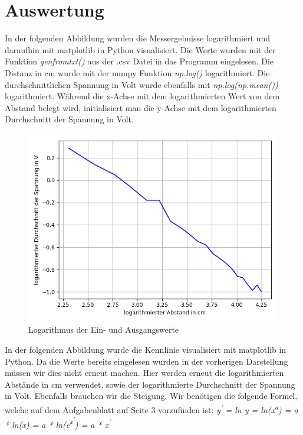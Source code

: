 \documentclass[12pt, oneside, a4paper, \docLanguage]{report}
\begin{document}
\section{Auswertung}
\label{chap:VERSUCH_2_AUSWERTUNG}
In der folgenden Abbildung wurden die Messergebnisse logarithmiert und daraufhin mit matplotlib in Python visualisiert.
Die Werte wurden mit der Funktion \textit{genfromtxt()} aus der .csv Datei in das Programm eingelesen.
Die Distanz in cm wurde mit der numpy Funktion \textit{np.log()} logarithmiert. Die durchschnittlichen Spannung in Volt wurde ebenfalls mit \textit{np.log(np.mean())} logarithmiert. 
Während die x-Achse mit dem logarithmierten Wert von dem Abstand belegt wird, initialisiert man die y-Achse mit dem logarithmierten Durchschnitt der Spannung in Volt.

\begin{figure}[hbt!]
	\centering\small
	\includegraphics[width=\textwidth]{media/myplot4.png}
	\caption{Logarithmus der Ein- und Ausgangswerte}
	\label{fig:Logarithmus der Ein- und Ausgangswerter}
\end{figure}
\newpage
In der folgenden Abbildung wurde die Kennlinie visualisiert mit matplotlib in Python.
\newline
Da die Werte bereits eingelesen wurden in der vorherigen Darstellung müssen wir dies nicht erneut machen.
Hier werden erneut die logarithmierten Abstände in cm verwendet, sowie der logarithmierte Durchschnitt der Spannung in Volt. Ebenfalls brauchen wir die Steigung.
Wir benötigen die folgende Formel, welche auf dem Aufgabenblatt auf Seite 3 vorzufinden ist:
\textit{y\textsuperscript{'} = ln y = ln(x\textsuperscript{a}) = a * ln(x) = a * ln(e\textsuperscript{x\textsuperscript{'}}) = a * x\textsuperscript{'}}
\newline
\newline
\end{document}
